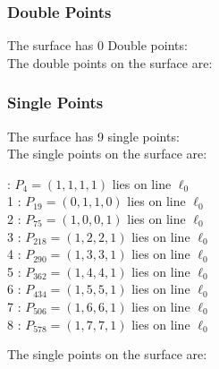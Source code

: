 \documentclass{article}
\begin{document}
{\subsubsection*{Double Points}
The surface has 0 Double points:\\
The double points on the surface are:\\
\begin{multicols}{2}
\noindent
\end{multicols}
\subsubsection*{Single Points}
The surface has 9 single points:\\
The single points on the surface are:\\
\begin{multicols}{2}
 : $P_{4}=( 1, 1, 1, 1 )$ lies on line $\ell_{0}$\\
1 : $P_{19}=( 0, 1, 1, 0 )$ lies on line $\ell_{0}$\\
2 : $P_{75}=( 1, 0, 0, 1 )$ lies on line $\ell_{0}$\\
3 : $P_{218}=( 1, 2, 2, 1 )$ lies on line $\ell_{0}$\\
4 : $P_{290}=( 1, 3, 3, 1 )$ lies on line $\ell_{0}$\\
5 : $P_{362}=( 1, 4, 4, 1 )$ lies on line $\ell_{0}$\\
6 : $P_{434}=( 1, 5, 5, 1 )$ lies on line $\ell_{0}$\\
7 : $P_{506}=( 1, 6, 6, 1 )$ lies on line $\ell_{0}$\\
8 : $P_{578}=( 1, 7, 7, 1 )$ lies on line $\ell_{0}$\\
\end{multicols}
The single points on the surface are:\\
}
\end{document}
